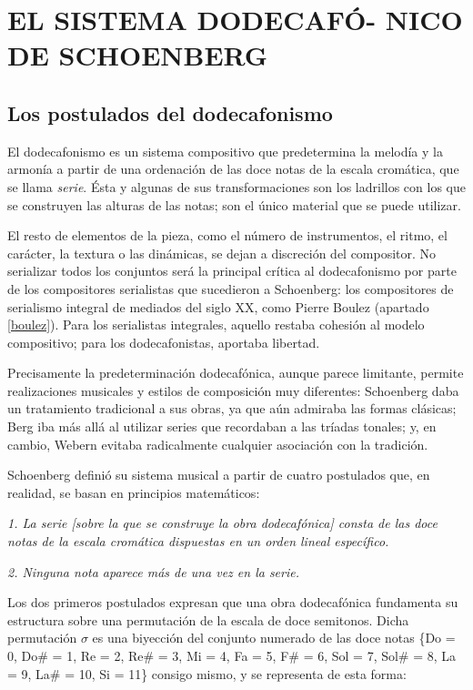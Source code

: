 \chapter[EL SISTEMA DODECAFÓNICO DE SCHOENBERG]{EL SISTEMA DODECAFÓ- NICO DE SCHOENBERG}
	\section{Los postulados del dodecafonismo}
		El dodecafonismo es un sistema compositivo que predetermina la melodía y la armonía a partir de una ordenación de las doce notas de la escala cromática, que se llama \textit{serie}. Ésta y algunas de sus transformaciones son los ladrillos con los que se construyen las alturas de las notas; son el único material que se puede utilizar.
		
		El resto de elementos de la pieza, como el número de instrumentos, el ritmo, el carácter, la textura o las dinámicas, se dejan a discreción del compositor. No serializar todos los conjuntos será la principal crítica al dodecafonismo por parte de los compositores serialistas que sucedieron a Schoenberg: los compositores de serialismo integral de mediados del siglo XX, como Pierre Boulez (apartado \ref{boulez}). Para los serialistas integrales, aquello restaba cohesión al modelo compositivo; para los dodecafonistas, aportaba libertad.
		
		Precisamente la predeterminación dodecafónica, aunque parece limitante, permite realizaciones musicales y estilos de composición muy diferentes: Schoenberg daba un tratamiento tradicional a sus obras, ya que aún admiraba las formas clásicas; Berg iba más allá al utilizar series que recordaban a las tríadas tonales; y, en cambio, Webern evitaba radicalmente cualquier asociación con la tradición.
		
		Schoenberg definió su sistema musical a partir de cuatro postulados que, en realidad, se basan en principios matemáticos:
		
		\emph{1. La serie \emph{[sobre la que se construye la obra dodecafónica]} consta de las doce notas de la escala cromática dispuestas en un orden lineal específico.}
		
		\emph{2. Ninguna nota aparece más de una vez en la serie.}
		
		Los dos primeros postulados expresan que una obra dodecafónica fundamenta su estructura sobre una permutación de la escala de doce semitonos. Dicha permutación $\sigma$ es una biyección del conjunto numerado de las doce notas \{Do = 0, Do\# = 1, Re = 2, Re\# = 3, Mi = 4, Fa = 5, F\# = 6, Sol = 7, Sol\# = 8, La = 9, La\# = 10, Si = 11\} consigo mismo, y se representa de esta forma:
		
